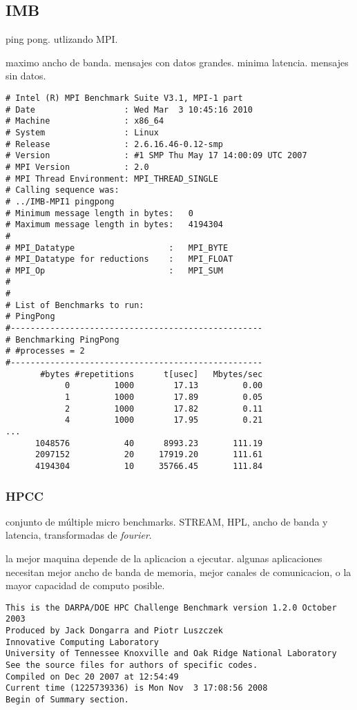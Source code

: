 \documentclass[a4paper]{report}
\begin{document}
\subsection{IMB}

ping pong. utlizando MPI.

maximo ancho de banda. mensajes con datos grandes.
minima latencia. mensajes sin datos.

\begin{verbatim}
# Intel (R) MPI Benchmark Suite V3.1, MPI-1 part
# Date                  : Wed Mar  3 10:45:16 2010
# Machine               : x86_64
# System                : Linux
# Release               : 2.6.16.46-0.12-smp
# Version               : #1 SMP Thu May 17 14:00:09 UTC 2007
# MPI Version           : 2.0
# MPI Thread Environment: MPI_THREAD_SINGLE
# Calling sequence was:
# ../IMB-MPI1 pingpong
# Minimum message length in bytes:   0
# Maximum message length in bytes:   4194304
#
# MPI_Datatype                   :   MPI_BYTE
# MPI_Datatype for reductions    :   MPI_FLOAT
# MPI_Op                         :   MPI_SUM
#
#
# List of Benchmarks to run:
# PingPong
#---------------------------------------------------
# Benchmarking PingPong
# #processes = 2
#---------------------------------------------------
       #bytes #repetitions      t[usec]   Mbytes/sec
            0         1000        17.13         0.00
            1         1000        17.89         0.05
            2         1000        17.82         0.11
            4         1000        17.95         0.21
...
      1048576           40      8993.23       111.19
      2097152           20     17919.20       111.61
      4194304           10     35766.45       111.84
\end{verbatim}

\subsubsection{HPCC}

conjunto de m\'ultiple micro benchmarks.
STREAM, HPL, ancho de banda y latencia, transformadas de {\it fourier}.

la mejor maquina depende de la aplicacion a ejecutar. algunas aplicaciones necesitan mejor ancho de banda de memoria, mejor canales de comunicacion, o la mayor capacidad de computo 
posible.

\begin{verbatim}
This is the DARPA/DOE HPC Challenge Benchmark version 1.2.0 October 2003
Produced by Jack Dongarra and Piotr Luszczek
Innovative Computing Laboratory
University of Tennessee Knoxville and Oak Ridge National Laboratory
See the source files for authors of specific codes.
Compiled on Dec 20 2007 at 12:54:49
Current time (1225739336) is Mon Nov  3 17:08:56 2008
Begin of Summary section.
\end{verbatim}
\end{document}
